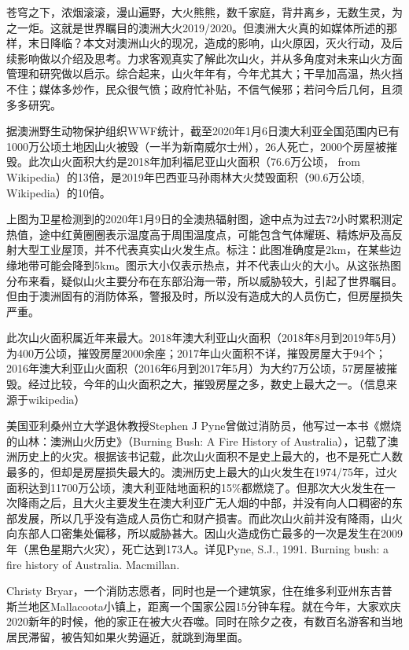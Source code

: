 \documentclass[]{book}
\begin{document}
苍穹之下，浓烟滚滚，漫山遍野，大火熊熊，数千家庭，背井离乡，无数生灵，为之一炬。这就是世界瞩目的澳洲大火2019/2020。但澳洲大火真的如媒体所述的那样，末日降临？本文对澳洲山火的现况，造成的影响，山火原因，灭火行动，及后续影响做以介绍及思考。力求客观真实了解此次山火，并从多角度对未来山火方面管理和研究做以启示。综合起来，山火年年有，今年尤其大；干旱加高温，热火挡不住；媒体多炒作，民众很气愤；政府忙补贴，不信气候邪；若问今后几何，且须多多研究。

据澳洲野生动物保护组织WWF统计，截至2020年1月6日澳大利亚全国范围内已有1000万公顷土地因山火被毁（一半为新南威尔士州），26人死亡，2000个房屋被摧毁。此次山火面积大约是2018年加利福尼亚山火面积（76.6万公顷， from Wikipedia）的13倍，是2019年巴西亚马孙雨林大火焚毁面积（90.6万公顷, Wikipedia）的10倍。

上图为卫星检测到的2020年1月9日的全澳热辐射图，途中点为过去72小时累积测定热值，途中红黄圈圈表示温度高于周围温度点，可能包含气体耀斑、精炼炉及高反射大型工业屋顶，并不代表真实山火发生点。标注：此图准确度是2km，在某些边缘地带可能会降到5km。图示大小仅表示热点，并不代表山火的大小。从这张热图分布来看，疑似山火主要分布在东部沿海一带，所以威胁较大，引起了世界瞩目。但由于澳洲固有的消防体系，警报及时，所以没有造成大的人员伤亡，但房屋损失严重。

此次山火面积属近年来最大。2018年澳大利亚山火面积（2018年8月到2019年5月）为400万公顷，摧毁房屋2000余座；2017年山火面积不详，摧毁房屋大于94个；2016年澳大利亚山火面积（2016年6月到2017年5月）为大约7万公顷，57房屋被摧毁。经过比较，今年的山火面积之大，摧毁房屋之多，数史上最大之一。（信息来源于wikipedia）

美国亚利桑州立大学退休教授Stephen J Pyne曾做过消防员，他写过一本书《燃烧的山林：澳洲山火历史》（Burning Bush: A Fire History of Australia），记载了澳洲历史上的火灾。根据该书记载，此次山火面积不是史上最大的，也不是死亡人数最多的，但却是房屋损失最大的。澳洲历史上最大的山火发生在1974/75年，过火面积达到11700万公顷，澳大利亚陆地面积的15\%都燃烧了。但那次大火发生在一次降雨之后，且大火主要发生在澳大利亚广无人烟的中部，并没有向人口稠密的东部发展，所以几乎没有造成人员伤亡和财产损害。而此次山火前并没有降雨，山火向东部人口密集处偏移，所以威胁甚大。因山火造成伤亡最多的一次是发生在2009年（黑色星期六火灾），死亡达到173人。详见Pyne, S.J., 1991. Burning bush: a fire history of Australia. Macmillan.

Christy Bryar，一个消防志愿者，同时也是一个建筑家，住在维多利亚州东吉普斯兰地区Mallacoota小镇上，距离一个国家公园15分钟车程。就在今年，大家欢庆2020新年的时候，他的家正在被大火吞噬。同时在除夕之夜，有数百名游客和当地居民滞留，被告知如果火势逼近，就跳到海里面。
\end{document}

